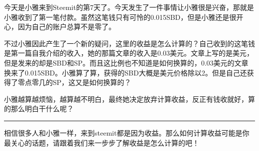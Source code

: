 \documentclass[]{ctexbook}
\begin{document}
今天是小雅来到Steemit的第7天了。今天发生了一件事情让小雅很是兴奋，那就是小雅收到了第一笔付款。虽然这笔钱只有可怜的0.015SBD，但是小雅还是很开心，因为自己的账户总算不是零了。

不过小雅因此产生了一个新的疑问，这里的收益是怎么计算的？自己收到的这笔钱是第一篇自我介绍的收入，她的那篇文章的收入是0.03美元。文章上写的是美元，但是发来的却是SBD和SP。而且这比例也不知道是如何换算的，0.03美元的文章换来了0.015SBD。小雅算了算，获得的SBD大概是美元价格除以2。但是自己还获得了零点零几的SP，这又是如何换算的？

小雅越算越烦恼，越算越不明白，最终她决定放弃计算收益，反正有钱收就好，算的那么明白干什么呢？

\begin{center}\rule{0.5\linewidth}{\linethickness}\end{center}

相信很多人和小雅一样，来到steemit都是因为收益。那么如何计算收益可能是你最关心的话题，请跟着我们来一步步了解收益是怎么计算的吧！
\end{document}
